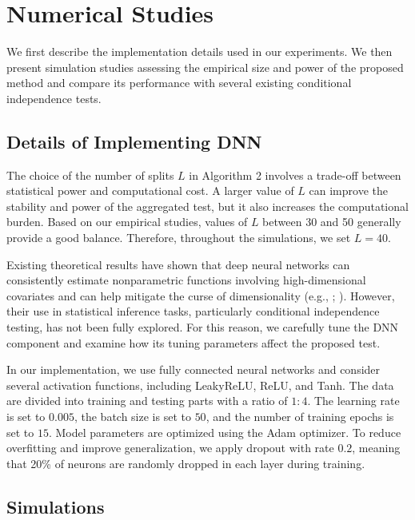 \documentclass[12pt,reqno,oneside]{amsbook}
\theoremstyle{definition}
\theoremstyle{remark}
\begin{document}
\section{Numerical Studies}
\label{Numerical studies}

We first describe the implementation details used in our experiments. We then present simulation studies assessing the empirical size and power of the proposed method and compare its performance with several existing conditional independence tests.

\subsection{Details of Implementing DNN}

The choice of the number of splits $L$ in Algorithm 2 involves a trade-off between statistical power and computational cost. A larger value of $L$ can improve the stability and power of the aggregated test, but it also increases the computational burden. Based on our empirical studies, values of $L$ between 30 and 50 generally provide a good balance. Therefore, throughout the simulations, we set $L=40$.

Existing theoretical results have shown that deep neural networks can consistently estimate nonparametric functions involving high-dimensional covariates and can help mitigate the curse of dimensionality (e.g., \cite{chen1998sieve}; \cite{schmidt2020nonparametric}). However, their use in statistical inference tasks, particularly conditional independence testing, has not been fully explored. For this reason, we carefully tune the DNN component and examine how its tuning parameters affect the proposed test.

In our implementation, we use fully connected neural networks and consider several activation functions, including LeakyReLU, ReLU, and Tanh. The data are divided into training and testing parts with a ratio of $1:4$. The learning rate is set to $0.005$, the batch size is set to $50$, and the number of training epochs is set to $15$. Model parameters are optimized using the Adam optimizer. To reduce overfitting and improve generalization, we apply dropout with rate $0.2$, meaning that 20\% of neurons are randomly dropped in each layer during training.

\subsection{Simulations}
\label{simulation_results}
\end{document}
